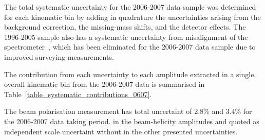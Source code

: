 The total systematic uncertainty for the 2006-2007 data sample was
determined for each kinematic bin by adding in quadrature the
  uncertainties arising from the background correction, the
  missing-mass shifts, and the detector effects.  The 1996-2005 sample also has a
systematic uncertainty from misalignment of the spectrometer~\cite{Air09}, which has been eliminated for the 2006-2007 data sample due to improved
  surveying measurements. 

The contribution from each uncertainty to each amplitude extracted in a single, overall kinematic bin from the 2006-2007 data  is summarised in Table~\ref{table_systematic_contributions_0607}.

The beam polarisation measurement has total uncertaint of 2.8\%  and 3.4\% for the 2006-2007 data taking period.  in the beam-helicity amplitudes and  quoted as independent scale uncertaint without  in the other presented uncertainties.


